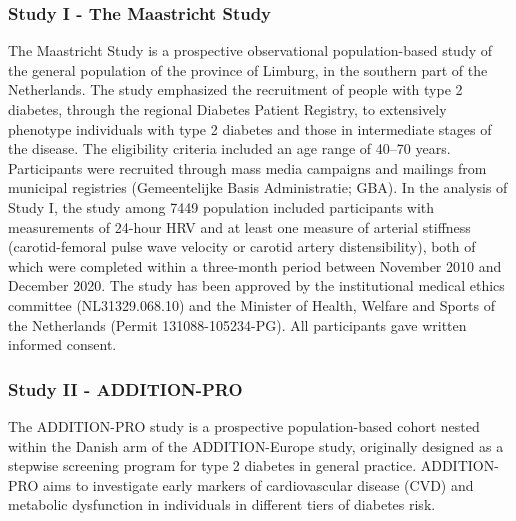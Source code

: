 \documentclass[
  a4paper,
  headsepline=true,
  open=any]{scrbook}
\begin{document}
\hypertarget{study-i---the-maastricht-study}{%
\subsubsection{Study I - The Maastricht
Study}\label{study-i---the-maastricht-study}}

The Maastricht Study is a prospective observational population-based
study of the general population of the province of Limburg, in the
southern part of the Netherlands. The study emphasized the recruitment
of people with type 2 diabetes, through the regional Diabetes Patient
Registry, to extensively phenotype individuals with type 2 diabetes and
those in intermediate stages of the disease. The eligibility criteria
included an age range of 40--70 years. Participants were recruited
through mass media campaigns and mailings from municipal registries
(Gemeentelijke Basis Administratie; GBA). In the analysis of Study I,
the study among 7449 population included participants with measurements
of 24-hour HRV and at least one measure of arterial stiffness
(carotid-femoral pulse wave velocity or carotid artery distensibility),
both of which were completed within a three-month period between
November 2010 and December 2020. The study has been approved by the
institutional medical ethics committee (NL31329.068.10) and the Minister
of Health, Welfare and Sports of the Netherlands (Permit
131088-105234-PG). All participants gave written informed consent.

\hypertarget{study-ii---addition-pro}{%
\subsubsection{Study II - ADDITION-PRO}\label{study-ii---addition-pro}}

The ADDITION-PRO study is a prospective population-based cohort nested
within the Danish arm of the ADDITION-Europe study, originally designed
as a stepwise screening program for type 2 diabetes in general practice.
ADDITION-PRO aims to investigate early markers of cardiovascular disease
(CVD) and metabolic dysfunction in individuals in different tiers of
diabetes risk.
\end{document}
